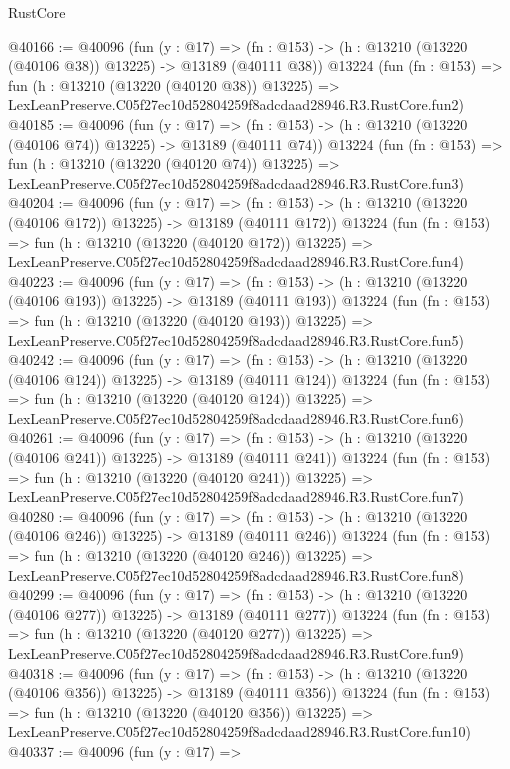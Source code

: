 \begin{lexlean}{RustCore}
\begin{coremodule}
@40166 := @40096
    (fun (y : @17) =>
    (fn : @153) -> (h : @13210 (@13220 (@40106 @38)) @13225) -> @13189 (@40111 @38))
    @13224
    (fun (fn : @153) =>
    fun (h : @13210 (@13220 (@40120 @38)) @13225) =>
    LexLeanPreserve.C05f27ec10d52804259f8adcdaad28946.R3.RustCore.fun2)
@40185 := @40096
    (fun (y : @17) =>
    (fn : @153) -> (h : @13210 (@13220 (@40106 @74)) @13225) -> @13189 (@40111 @74))
    @13224
    (fun (fn : @153) =>
    fun (h : @13210 (@13220 (@40120 @74)) @13225) =>
    LexLeanPreserve.C05f27ec10d52804259f8adcdaad28946.R3.RustCore.fun3)
@40204 := @40096
    (fun (y : @17) =>
    (fn : @153) -> (h : @13210 (@13220 (@40106 @172)) @13225) -> @13189 (@40111 @172))
    @13224
    (fun (fn : @153) =>
    fun (h : @13210 (@13220 (@40120 @172)) @13225) =>
    LexLeanPreserve.C05f27ec10d52804259f8adcdaad28946.R3.RustCore.fun4)
@40223 := @40096
    (fun (y : @17) =>
    (fn : @153) -> (h : @13210 (@13220 (@40106 @193)) @13225) -> @13189 (@40111 @193))
    @13224
    (fun (fn : @153) =>
    fun (h : @13210 (@13220 (@40120 @193)) @13225) =>
    LexLeanPreserve.C05f27ec10d52804259f8adcdaad28946.R3.RustCore.fun5)
@40242 := @40096
    (fun (y : @17) =>
    (fn : @153) -> (h : @13210 (@13220 (@40106 @124)) @13225) -> @13189 (@40111 @124))
    @13224
    (fun (fn : @153) =>
    fun (h : @13210 (@13220 (@40120 @124)) @13225) =>
    LexLeanPreserve.C05f27ec10d52804259f8adcdaad28946.R3.RustCore.fun6)
@40261 := @40096
    (fun (y : @17) =>
    (fn : @153) -> (h : @13210 (@13220 (@40106 @241)) @13225) -> @13189 (@40111 @241))
    @13224
    (fun (fn : @153) =>
    fun (h : @13210 (@13220 (@40120 @241)) @13225) =>
    LexLeanPreserve.C05f27ec10d52804259f8adcdaad28946.R3.RustCore.fun7)
@40280 := @40096
    (fun (y : @17) =>
    (fn : @153) -> (h : @13210 (@13220 (@40106 @246)) @13225) -> @13189 (@40111 @246))
    @13224
    (fun (fn : @153) =>
    fun (h : @13210 (@13220 (@40120 @246)) @13225) =>
    LexLeanPreserve.C05f27ec10d52804259f8adcdaad28946.R3.RustCore.fun8)
@40299 := @40096
    (fun (y : @17) =>
    (fn : @153) -> (h : @13210 (@13220 (@40106 @277)) @13225) -> @13189 (@40111 @277))
    @13224
    (fun (fn : @153) =>
    fun (h : @13210 (@13220 (@40120 @277)) @13225) =>
    LexLeanPreserve.C05f27ec10d52804259f8adcdaad28946.R3.RustCore.fun9)
@40318 := @40096
    (fun (y : @17) =>
    (fn : @153) -> (h : @13210 (@13220 (@40106 @356)) @13225) -> @13189 (@40111 @356))
    @13224
    (fun (fn : @153) =>
    fun (h : @13210 (@13220 (@40120 @356)) @13225) =>
    LexLeanPreserve.C05f27ec10d52804259f8adcdaad28946.R3.RustCore.fun10)
@40337 := @40096
    (fun (y : @17) =>

\end{coremodule}
\end{lexlean}

